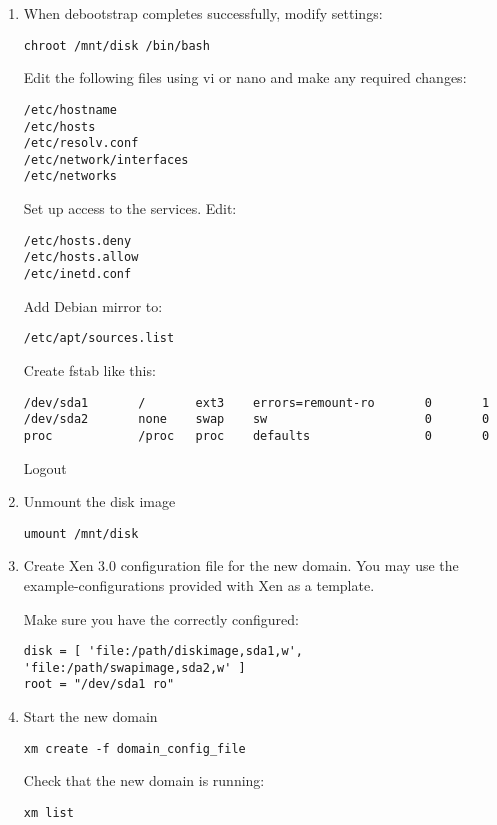 \begin{enumerate}
\item When debootstrap completes successfully, modify settings:
\begin{verbatim}
chroot /mnt/disk /bin/bash
\end{verbatim}

  Edit the following files using vi or nano and make any required
  changes:
\begin{verbatim}
/etc/hostname
/etc/hosts
/etc/resolv.conf
/etc/network/interfaces
/etc/networks
\end{verbatim}

  Set up access to the services. Edit:
\begin{verbatim}
/etc/hosts.deny
/etc/hosts.allow
/etc/inetd.conf
\end{verbatim}

  Add Debian mirror to:
\begin{verbatim}
/etc/apt/sources.list
\end{verbatim}

  Create fstab like this:
\begin{verbatim}
/dev/sda1       /       ext3    errors=remount-ro       0       1
/dev/sda2       none    swap    sw                      0       0
proc            /proc   proc    defaults                0       0
\end{verbatim}

  Logout

\item Unmount the disk image
\begin{verbatim}
umount /mnt/disk
\end{verbatim}

\item Create Xen 3.0 configuration file for the new domain. You may use
  the example-configurations provided with Xen as a template.

  Make sure you have the correctly configured:
\begin{verbatim}
disk = [ 'file:/path/diskimage,sda1,w', 'file:/path/swapimage,sda2,w' ]
root = "/dev/sda1 ro"
\end{verbatim}

\item Start the new domain
\begin{verbatim}
xm create -f domain_config_file
\end{verbatim}

  Check that the new domain is running:
\begin{verbatim}
xm list
\end{verbatim}


\end{enumerate}
